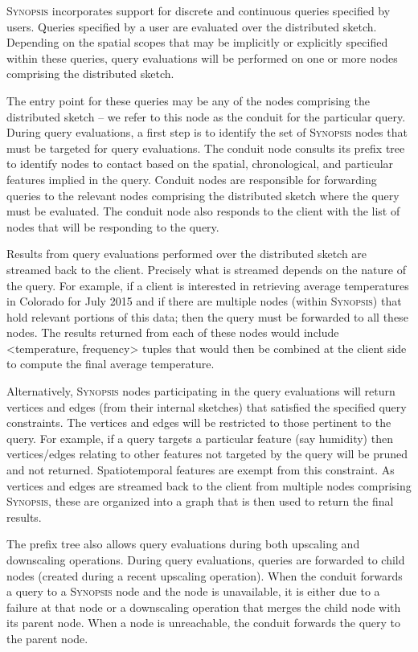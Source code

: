 \textsc{Synopsis} incorporates support for discrete and continuous queries specified by users. Queries specified by a user are evaluated over the distributed sketch. Depending on the spatial scopes that may be implicitly or explicitly specified within these queries, query evaluations will be performed on one or more nodes comprising the distributed sketch. 

The entry point for these queries may be any of the nodes comprising the distributed sketch – we refer to this node as the conduit for the particular query.  During query evaluations, a first step is to identify the set of \textsc{Synopsis} nodes that must be targeted for query evaluations. The conduit node consults its prefix tree to identify nodes to contact based on the spatial, chronological, and particular features implied in the query. Conduit nodes are responsible for forwarding queries to the relevant nodes comprising the distributed sketch where the query must be evaluated.  The conduit node also responds to the client with the list of nodes that will be responding to the query. 

Results from query evaluations performed over the distributed sketch are streamed back to the client.  Precisely what is streamed depends on the nature of the query.  For example, if a client is interested in retrieving average temperatures in Colorado for July 2015 and if there are multiple nodes (within \textsc{Synopsis}) that hold relevant portions of this data; then the query must be forwarded to all these nodes. The results returned from each of these nodes would include {\textless}temperature, frequency{\textgreater} tuples that would then be combined at the client side to compute the final average temperature.

Alternatively, \textsc{Synopsis} nodes participating in the query evaluations will return vertices and edges (from their internal sketches) that satisfied the specified query constraints. The vertices and edges will be restricted to those pertinent to the query. For example, if a query targets a particular feature (say humidity) then vertices/edges relating to other features not targeted by the query will be pruned and not returned.  Spatiotemporal features are exempt from this constraint. As vertices and edges are streamed back to the client from multiple nodes comprising \textsc{Synopsis}, these are organized into a graph that is then used to return the final results. 

The prefix tree also allows query evaluations during both upscaling and downscaling operations. During query evaluations, queries are forwarded to child nodes (created during a recent upscaling operation). When the conduit forwards a query to a \textsc{Synopsis} node and the node is unavailable, it is either due to a failure at that node or a downscaling operation that merges the child node with its parent node. When a node is unreachable, the conduit forwards the query to the parent node. 

